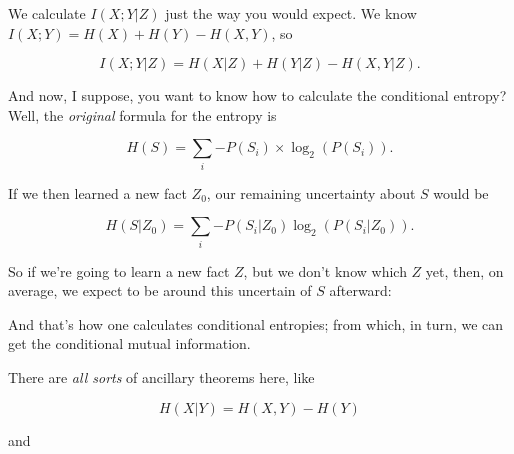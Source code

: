 {{{
 We calculate $I(X;Y|Z)$ just the way you would expect. We
know $I(X;Y) = H(X) + H(Y) - H(X,Y)$, so}

\begin{equation*}
  I(X;Y|Z) = H(X|Z) + H(Y|Z) - H(X,Y|Z).
\end{equation*}


{
 And now, I suppose, you want to know how to calculate the
conditional entropy? Well, the \textit{original} formula for the
entropy is}

\begin{equation*}
 H(S) = \sum_{i}{-P(S_{i}) \times \log_{2}(P(S_{i}))}.
\end{equation*}


{
 If we then learned a new fact $Z_{0}$, our remaining
uncertainty about $S$ would be}

\begin{equation*}
 H(S|Z_0) =\sum_{i}{-P(S_{i}|Z_{0})\log_{2}(P(S_{i}|Z_{0}))}.
\end{equation*}

{
 So if we're going to learn a new fact $Z$, but we
don't know which $Z$ yet, then, on average, we expect to
be around this uncertain of $S$ afterward:}


{
 And that's how one calculates conditional
entropies; from which, in turn, we can get the conditional mutual
information. }

{
 There are \textit{all sorts} of ancillary theorems here, like}

\begin{equation*}
 H(X|Y) = H (X,Y) - H(Y)
\end{equation*}


{
 and}


}}
